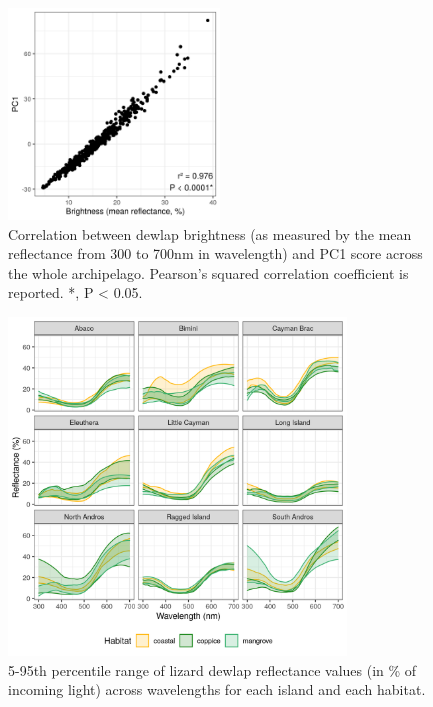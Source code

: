 \begin{figure}
	\centering
	\includegraphics[width=0.5\textwidth]{"../analyses/03-PCA/figure_brightness_pooled"}
	\caption{Correlation between dewlap brightness (as measured by the mean reflectance from 300 to 700nm in wavelength) and PC1 score across the whole archipelago. Pearson's squared correlation coefficient is reported. *, P < 0.05.}
	\label{supfig:brightness_pooled}
\end{figure}

\begin{figure}[H]
	\centering
	\includegraphics[width=0.8\textwidth]{"../analyses/02-reflectance/figure_reflectance"}
	\caption{5-95th percentile range of lizard dewlap reflectance values (in \% of incoming light) across wavelengths for each island and each habitat.}
	\label{supfig:reflectance}
\end{figure}

